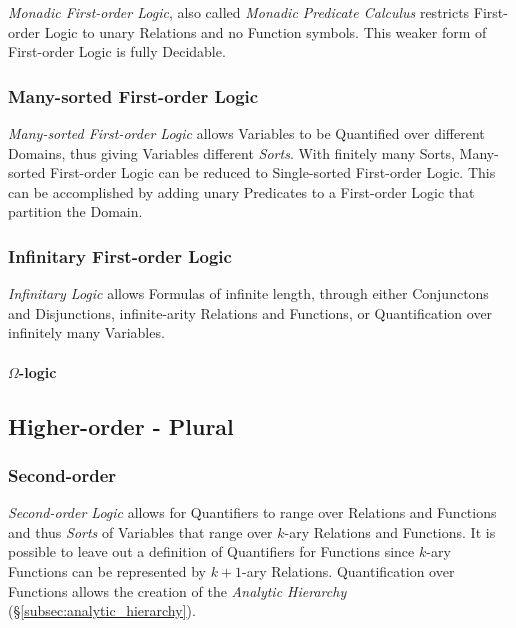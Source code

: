 \documentclass{article}
\begin{document}
\emph{Monadic First-order Logic}, also called \emph{Monadic Predicate
  Calculus} restricts First-order Logic to unary Relations and no
Function symbols. This weaker form of First-order Logic is fully
Decidable.

\subsubsection{Many-sorted First-order Logic}\label{subsec:manysorted_logic}

\emph{Many-sorted First-order Logic} allows Variables to be Quantified
over different Domains, thus giving Variables different
\emph{Sorts}. With finitely many Sorts, Many-sorted First-order Logic
can be reduced to Single-sorted First-order Logic. This can be
accomplished by adding unary Predicates to a First-order Logic that
partition the Domain.

\subsubsection{Infinitary First-order Logic}

\emph{Infinitary Logic} allows Formulas of infinite length, through
either Conjunctons and Disjunctions, infinite-arity Relations and
Functions, or Quantification over infinitely many Variables.

\paragraph{$\Omega$-logic}\label{subsec:omega_logic}

\subsection{Higher-order - Plural}\label{subsec:higher_order}

\subsubsection{Second-order}\label{subsec:second_order}

\emph{Second-order Logic} allows for Quantifiers to range over
Relations and Functions and thus \emph{Sorts} of Variables that range
over $k$-ary Relations and Functions. It is possible to leave out a
definition of Quantifiers for Functions since $k$-ary Functions can be
represented by $k+1$-ary Relations.\cite{shapiro00} Quantification
over Functions allows the creation of the \emph{Analytic Hierarchy}
(\S\ref{subsec:analytic_hierarchy}).
\end{document}
